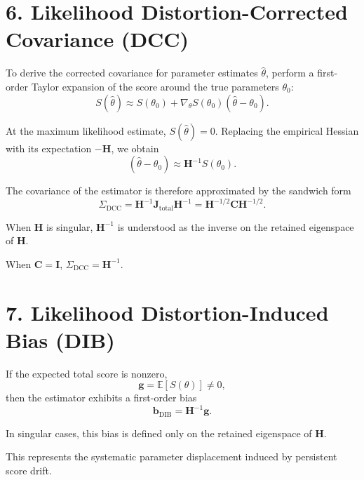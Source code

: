 \documentclass[11pt]{article}
\begin{document}
\section*{6. Likelihood Distortion-Corrected Covariance (DCC)}

To derive the corrected covariance for parameter estimates $\hat{\theta}$, perform a first-order Taylor expansion of the score around the true parameters $\theta_0$:
\begin{equation}
S(\hat{\theta}) \approx S(\theta_0) + \nabla_\theta S(\theta_0)(\hat{\theta} - \theta_0).
\end{equation}

At the maximum likelihood estimate, $S(\hat{\theta}) = 0$. Replacing the empirical Hessian with its expectation $-\mathbf H$, we obtain
\begin{equation}
(\hat{\theta} - \theta_0) \approx \mathbf H^{-1} S(\theta_0).
\end{equation}

The covariance of the estimator is therefore approximated by the sandwich form
\begin{equation}
\Sigma_{\mathrm{DCC}}
=
\mathbf H^{-1}
\mathbf J_{\mathrm{total}}
\mathbf H^{-1}
=
\mathbf H^{-1/2}
\mathbf C
\mathbf H^{-1/2}.
\end{equation}

When $\mathbf H$ is singular, $\mathbf H^{-1}$ is understood as the inverse on the retained eigenspace of $\mathbf H$.

When $\mathbf C = \mathbf I$, $\Sigma_{\mathrm{DCC}} = \mathbf H^{-1}$.

\section*{7. Likelihood Distortion-Induced Bias (DIB)}

If the expected total score is nonzero,
\begin{equation}
\mathbf g = \mathbb{E}[S(\theta)] \neq 0,
\end{equation}
then the estimator exhibits a first-order bias
\begin{equation}
\mathbf b_{\mathrm{DIB}}
=
\mathbf H^{-1} \mathbf g.
\end{equation}

In singular cases, this bias is defined only on the retained eigenspace of $\mathbf H$.

This represents the systematic parameter displacement induced by persistent score drift.
\end{document}
